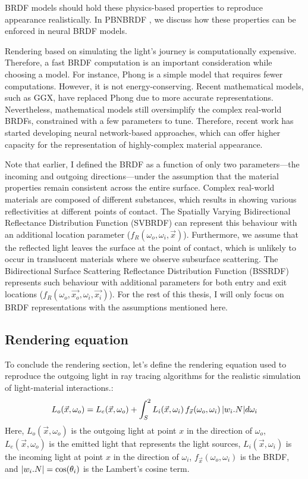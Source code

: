 \gls{BRDF} models should hold these physics-based properties to reproduce appearance realistically. In PBNBRDF \cite{pbnbrdf}, we discuss how these properties can be enforced in neural \gls{BRDF} models. 

Rendering based on simulating the light's journey is computationally expensive. Therefore, a fast \gls{BRDF} computation is an important consideration while choosing a model. For instance, Phong is a simple model that requires fewer computations. However, it is not energy-conserving. Recent mathematical models, such as GGX, have replaced Phong due to more accurate representations. Nevertheless, mathematical models still oversimplify the complex real-world \gls{BRDF}s, constrained with a few parameters to tune. Therefore, recent work has started developing neural network-based approaches, which can offer higher capacity for the representation of highly-complex material appearance.

Note that earlier, I defined the \gls{BRDF} as a function of only two parameters—the incoming and outgoing directions—under the assumption that the material properties remain consistent across the entire surface. Complex real-world materials are composed of different substances, which results in showing various reflectivities at different points of contact. The Spatially Varying Bidirectional Reflectance Distribution Function (\gls{SVBRDF}) can represent this behaviour with an additional location parameter ($f_R(\omega_o, \omega_i,  \vec{x})$). Furthermore, we assume that the reflected light leaves the surface at the point of contact, which is unlikely to occur in translucent materials where we observe subsurface scattering. The Bidirectional Surface Scattering Reflectance Distribution Function (\gls{BSSRDF}) represents such behaviour with additional parameters for both entry and exit locations ($f_R(\omega_o, \vec{x_o}, \omega_i,  \vec{x_i})$). For the rest of this thesis, I will only focus on \gls{BRDF} representations with the assumptions mentioned here.

\subsection{Rendering equation}

To conclude the rendering section, let's define the rendering equation used to reproduce the outgoing light in ray tracing algorithms for the realistic simulation of light-material interactions.:
\begin{equation}
L_o(\vec{x}, \omega_o) = L_e(\vec{x}, \omega_o)  +  \int_S^2 L_i(\vec{x}, \omega_i) \, f_{\vec{x}}(\omega_o,  \omega_i) \, \lvert w_i . N\rvert d\omega_i
\label{eqn:rendering-eqn}
\end{equation}
Here, $L_o(\vec{x}, \omega_o) $ is the outgoing light at point $x$ in the direction of $\omega_o$, $L_e(\vec{x}, \omega_o)$ is the emitted light that represents the light sources, $L_i(\vec{x}, \omega_i) $ is the incoming light at point $x$ in the direction of $\omega_i$, $f_{\vec{x}}(\omega_o,  \omega_i)$ is the \gls{BRDF}, and $\lvert w_i . N\rvert = \cos(\theta_i)$ is the Lambert's cosine term.

